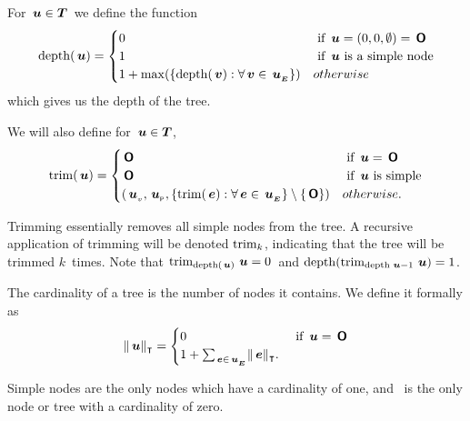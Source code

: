 \begin{definition}
  For \(\,\boldsymbol{u} \in \boldsymbol{T}\)\ we define the function
  \begin{align*}
      \operatorname{depth}(\,\boldsymbol{u}) = \begin{cases}
        0 & \text{ if } \,\boldsymbol{u} = (0,0,\emptyset) = \,\boldsymbol{\mathsf{O}} \\
        1 & \text{ if } \,\boldsymbol{u} \text{ is a simple node} \\
        1 + \max(\lbrace\operatorname{depth}(\,\boldsymbol{v}):\forall \,\boldsymbol{v} \in {\,\boldsymbol{u}}_{{}_{\boldsymbol{E}}}\rbrace) & otherwise
      \end{cases}
  \end{align*}
  which gives us the depth of the tree.
\end{definition}

\begin{definition}
  We will also define for \(\,\boldsymbol{u} \in \boldsymbol{T}\),
  \begin{align*}
      \operatorname{trim}(\,\boldsymbol{u}) = \begin{cases}
        \,\boldsymbol{\mathsf{O}} & \text{ if } \,\boldsymbol{u} = \,\boldsymbol{\mathsf{O}} \\
        \,\boldsymbol{\mathsf{O}} & \text{ if } \,\boldsymbol{u} \text{ is simple} \\
        ({{\,\boldsymbol{u}}_{{}_{v}}}, {{\,\boldsymbol{u}}_{{}_{\mathsf{P}}}}, {\lbrace \operatorname{trim}(\,\boldsymbol{e}): \forall\,\boldsymbol{e}\in{\,\boldsymbol{u}}_{{}_{\boldsymbol{E}}} \rbrace \setminus \{\,\boldsymbol{\mathsf{O}}\}}) & otherwise.
      \end{cases}
  \end{align*}
\end{definition}

Trimming essentially removes all simple nodes from the tree.   A recursive
application of trimming will be denoted \(\operatorname{trim}_{k}\), indicating that the tree  will be trimmed
\(k\)\ times. Note that \(\operatorname{trim}_{\operatorname{depth}(\,\boldsymbol{u})}{\,\boldsymbol{u}} = 0\)\ and \(\operatorname{depth}(\operatorname{trim}_{\operatorname{depth}{\,\boldsymbol{u}}-1}{\,\boldsymbol{u}}) =
1\).

\begin{definition}
  The cardinality of a tree is the number of nodes it contains. We define it formally as
  \begin{align*}
  \lVert{\,\boldsymbol{u}}\rVert_{\intercal} = \begin{cases}
    0 & \text{ if } \,\boldsymbol{u} = \,\boldsymbol{\mathsf{O}}\\
    1 + \sum_{\,\boldsymbol{e}\in{\,\boldsymbol{u}}_{{}_{\boldsymbol{E}}}} \lVert{\,\boldsymbol{e}}\rVert_{\intercal}.
    \end{cases}
  \end{align*}

Simple nodes are the only nodes which have a cardinality of one, and \tzerotree\ is the only node or tree with a
cardinality of zero.
\end{definition}



